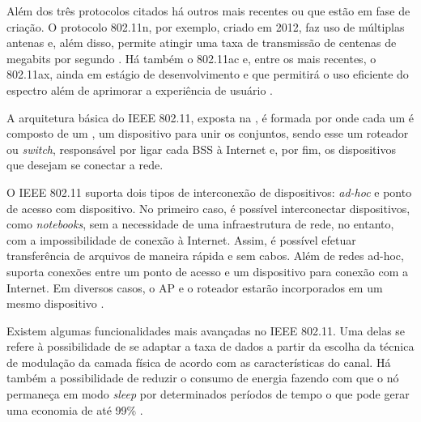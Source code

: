 Além dos três protocolos citados há outros mais recentes ou que estão em fase de criação. O protocolo 802.11n, por exemplo, criado em 2012, faz uso de múltiplas antenas e, além disso, permite atingir uma taxa de transmissão de centenas de megabits por segundo \cite{Kurose2012}. Há também o 802.11ac e, entre os mais recentes, o 802.11ax, ainda em estágio de desenvolvimento e que permitirá o uso eficiente do espectro além de aprimorar a experiência de usuário \cite{Afaqui2017}.

A arquitetura básica do IEEE 802.11, exposta na , é formada por  onde cada um é composto de um , um dispositivo para unir os conjuntos, sendo esse um roteador ou \textit{switch}, responsável por ligar cada BSS à Internet e, por fim, os dispositivos que desejam se conectar a rede.


O IEEE 802.11 suporta dois tipos de interconexão de dispositivos: \textit{ad-hoc} e ponto de acesso com dispositivo. No primeiro caso, é possível interconectar dispositivos, como \textit{notebooks}, sem a necessidade de uma infraestrutura de rede, no entanto, com a impossibilidade de conexão à Internet. Assim, é possível efetuar transferência de arquivos de maneira rápida e sem cabos. Além de redes ad-hoc, suporta conexões entre um ponto de acesso e um dispositivo para conexão com a Internet. Em diversos casos, o AP e o roteador estarão incorporados em um mesmo dispositivo \cite{Kurose2012}.



Existem algumas funcionalidades mais avançadas no IEEE 802.11. Uma delas se refere à possibilidade de se adaptar a taxa de dados a partir da escolha da técnica de modulação da camada física de acordo com as características do canal. Há também a possibilidade de reduzir o consumo de energia fazendo com que o nó permaneça em modo \textit{sleep} por determinados períodos de tempo o que pode gerar uma economia de até 99\% \cite{Kurose2012}.


